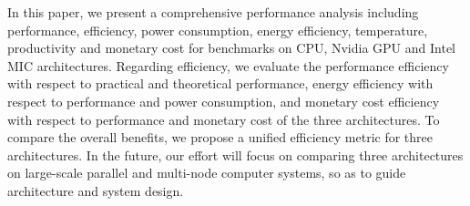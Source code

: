 In this paper, we present a comprehensive performance analysis including performance, efficiency, power consumption, energy efficiency, temperature, productivity and monetary cost for benchmarks on CPU, Nvidia GPU and Intel MIC architectures. Regarding efficiency, we evaluate the performance efficiency with respect to practical and theoretical performance, energy efficiency with respect to performance and power consumption, and monetary cost efficiency with respect to performance and monetary cost of the three architectures. To compare the overall benefits, we propose a unified efficiency metric for three architectures. In the future, our effort will focus on comparing three architectures on large-scale parallel and multi-node computer systems, so as to guide architecture and system design.
